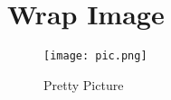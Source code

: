 \documentclass[a4paper,12pt]{book}
\begin{document}
\enlargethispage{\baselineskip}
 
 
\blindtext[2]
 
 
\blinditemize
\blindenumerate
\blinddescription
 
 
 
 
 
\newpage
 
\blindtext
 
 
 
 
\begin{figure}[ht]
\centering
 
 
 
 
\end{figure}
\blindtext
 
\newpage
 
\section*{Wrap Image}
 
 
\begingroup
 
 
\setlength{\intextsep}{0pt}
 
 
\setlength{\columnsep}{15pt}
 
 
 
 
 
\begin{wrapfigure}{r}{0.45\textwidth}
\centering
 
  \texttt{[image: pic.png]}
  \caption{Pretty Picture}\label{fig:prettypic}
\end{wrapfigure}
 
\end{document}
